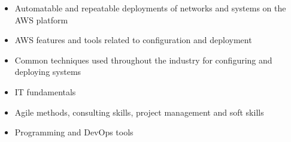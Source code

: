 \documentclass[6pt,a4paper,ragged2e,withhyper]{altacv}
\begin{document}
\begin{paracol}{2}
    \smallskip



    \begin{itemize}
      \item Automatable and repeatable deployments of networks and systems on the AWS platform
      \item AWS features and tools related to configuration and deployment
      \item Common techniques used throughout the industry for configuring and deploying systems
    \end{itemize}

    \vspace{-0.3cm}\divider


    \begin{itemize}
      \item IT fundamentals
      \item Agile methods, consulting skills, project management and soft skills
      \item Programming and DevOps tools
    \end{itemize}

    \switchcolumn



    \smallskip


    \cvtag{\LaTeX}

    \smallskip



    \smallskip


\end{paracol}
\end{document}
